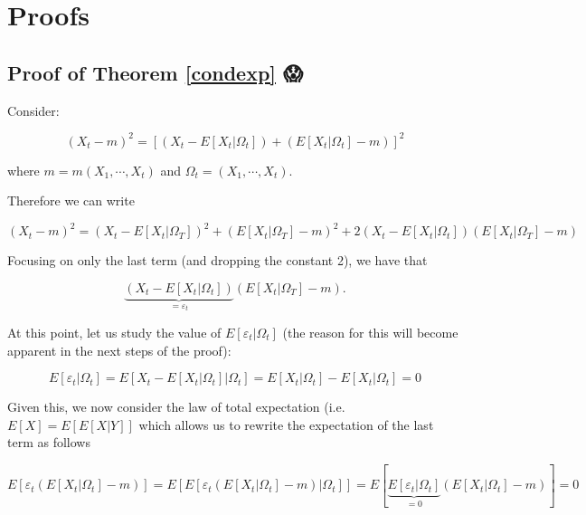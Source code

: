 \documentclass[]{book}
\theoremstyle{definition}
\theoremstyle{definition}
\theoremstyle{definition}
\theoremstyle{remark}
\begin{document}
\hypertarget{appendixc}{%
\chapter{Proofs}\label{appendixc}}

\hypertarget{proof-of-theorem-refcondexp}{%
\section{Proof of Theorem \ref{condexp}
😱}\label{proof-of-theorem-refcondexp}}

Consider:

\[{\left( {{X_t} - m} \right)^2} = {\left[ {\left( {{X_t} - E\left[ {{X_t}|{\Omega _t}} \right]} \right) + \left( {E\left[ {{X_t}|{\Omega _t}} \right] - m} \right)} \right]^2}\]

where \(m = m\left( {{X_{1}}, \cdots ,{X_{t}}} \right)\) and
\({\Omega _t} = \left( {{X_{1}}, \cdots ,{X_{t}}} \right)\).

Therefore we can write

\[{\left( {{X_t} - m} \right)^2} = {\left( {{X_t} - E\left[ {{X_t}|{\Omega _T}} \right]} \right)^2} + {\left( {E\left[ {{X_t}|{\Omega _T}} \right] - m} \right)^2} + 2\left( {{X_t} - E\left[ {{X_t}|{\Omega _t}} \right]} \right)\left( {E\left[ {{X_t}|{\Omega _T}} \right] - m} \right)\]

Focusing on only the last term (and dropping the constant 2), we have
that

\[\underbrace {\left( {{X_t} - E\left[ {{X_t}|{\Omega _t}} \right]} \right)}_{ = {\varepsilon _t}}\left( {E\left[ {{X_t}|{\Omega _T}} \right] - m} \right).\]

At this point, let us study the value of
\(E\left[ {{\varepsilon _t}|{\Omega _t}} \right]\) (the reason for this
will become apparent in the next steps of the proof):

\[E\left[ {{\varepsilon _t}|{\Omega _t}} \right] = E\left[ {{X_t} - E\left[ {{X_t}|{\Omega _t}} \right]|{\Omega _t}} \right] = E\left[ {{X_t}|{\Omega _t}} \right] - E\left[ {{X_t}|{\Omega _t}} \right] = 0\]

Given this, we now consider the law of total expectation (i.e.
\(E[X] = E[E[X|Y]]\) which allows us to rewrite the expectation of the
last term as follows

\[E\left[ {{\varepsilon _t}\left( {E\left[ {{X_t}|{\Omega _t}} \right] - m} \right)} \right] = E\left[ {E\left[ {{\varepsilon _t}\left( {E\left[ {{X_t}|{\Omega _t}} \right] - m} \right)|{\Omega _t}} \right]} \right] = E\left[ {\underbrace {E\left[ {{\varepsilon _t}|{\Omega _t}} \right]}_{ = 0}\left( {E\left[ {{X_t}|{\Omega _t}} \right] - m} \right)} \right] = 0\]
\end{document}
